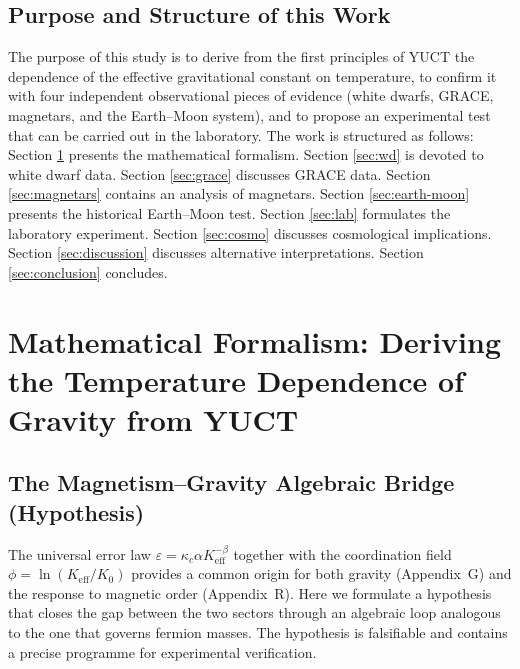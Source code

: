 \documentclass[12pt]{article}
\theoremstyle{remark}
\newcommand{\Keff}{K_{\mathrm{eff}}}
\newcommand{\kappac}{\kappa_c}
\begin{document}
	\subsection{Purpose and Structure of this Work}
	\label{subsec:purpose}
	
	The purpose of this study is to derive from the first principles of YUCT the dependence of the effective gravitational constant on temperature, to confirm it with four independent observational pieces of evidence (white dwarfs, GRACE, magnetars, and the Earth–Moon system), and to propose an experimental test that can be carried out in the laboratory. The work is structured as follows: Section \ref{sec:math} presents the mathematical formalism. Section \ref{sec:wd} is devoted to white dwarf data. Section \ref{sec:grace} discusses GRACE data. Section \ref{sec:magnetars} contains an analysis of magnetars. Section \ref{sec:earth-moon} presents the historical Earth–Moon test. Section \ref{sec:lab} formulates the laboratory experiment. Section \ref{sec:cosmo} discusses cosmological implications. Section \ref{sec:discussion} discusses alternative interpretations. Section \ref{sec:conclusion} concludes.
	
	\section{Mathematical Formalism: Deriving the Temperature Dependence of Gravity from YUCT}
	\label{sec:math}
	
	\subsection{The Magnetism–Gravity Algebraic Bridge (Hypothesis)}
	\label{subsec:magnetism-bridge}
	
	The universal error law $\varepsilon = \kappac \alpha \Keff^{-\beta}$ together with the
	coordination field $\phi = \ln(\Keff/K_0)$ provides a common origin for both gravity
	(Appendix~G) and the response to magnetic order (Appendix~R).  
	Here we formulate a hypothesis that closes the gap between the two sectors through an
	algebraic loop analogous to the one that governs fermion masses.  
	The hypothesis is falsifiable and contains a precise programme for experimental verification.
	
\end{document}

